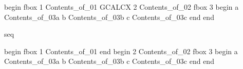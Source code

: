 begin
fbox 1
Contents_of_01
GCALCX
2
Contents_of_02
fbox 3
begin
a
Contents_of_03a
b
Contents_of_03b
c
Contents_of_03c
end
end

seq

begin
fbox 1
Contents_of_01
end
begin
2
Contents_of_02
fbox 3
begin
a
Contents_of_03a
b
Contents_of_03b
c
Contents_of_03c
end
end

